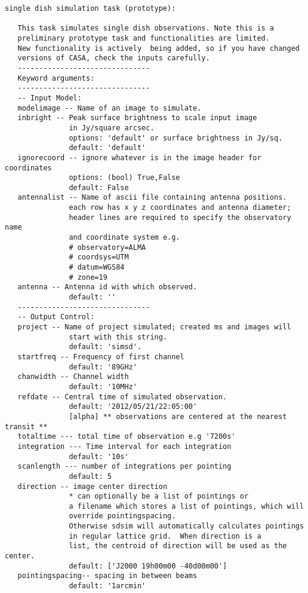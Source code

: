 \begin{verbatim}
single dish simulation task (prototype):        

   This task simulates single dish observations. Note this is a 
   preliminary prototype task and functionalities are limited. 
   New functionality is actively  being added, so if you have changed 
   versions of CASA, check the inputs carefully.
   -------------------------------
   Keyword arguments:
   -------------------------------
   -- Input Model:
   modelimage -- Name of an image to simulate.
   inbright -- Peak surface brightness to scale input image 
               in Jy/square arcsec.
               options: 'default' or surface brightness in Jy/sq. 
               default: 'default'
   ignorecoord -- ignore whatever is in the image header for coordinates
               options: (bool) True,False
               default: False 
   antennalist -- Name of ascii file containing antenna positions.
               each row has x y z coordinates and antenna diameter; 
               header lines are required to specify the observatory name
               and coordinate system e.g. 
               # observatory=ALMA
               # coordsys=UTM
               # datum=WGS84
               # zone=19
   antenna -- Antenna id with which observed. 
               default: ''
   -------------------------------
   -- Output Control:
   project -- Name of project simulated; created ms and images will
               start with this string. 
               default: 'simsd'.
   startfreq -- Frequency of first channel
               default: '89GHz'
   chanwidth -- Channel width
               default: '10MHz'
   refdate -- Central time of simulated observation. 
               default: '2012/05/21/22:05:00'
               [alpha] ** observations are centered at the nearest transit **
   totaltime --- total time of observation e.g '7200s'
   integration --- Time interval for each integration
               default: '10s'
   scanlength --- number of integrations per pointing
               default: 5
   direction -- image center direction
               * can optionally be a list of pointings or 
               a filename which stores a list of pointings, which will 
               override pointingspacing.
               Otherwise sdsim will automatically calculates pointings
               in regular lattice grid.  When direction is a
               list, the centroid of direction will be used as the center.
               default: ['J2000 19h00m00 -40d00m00']
   pointingspacing-- spacing in between beams
               default: '1arcmin'        

\end{verbatim}
